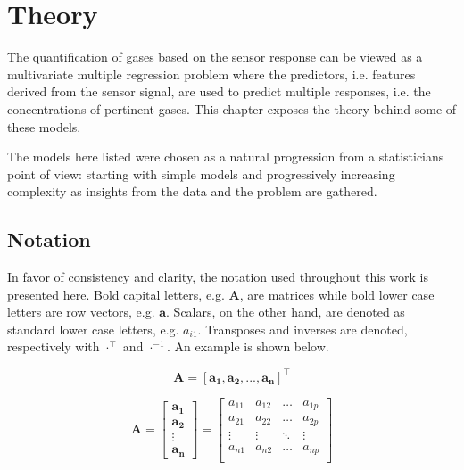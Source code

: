 \chapter{Theory}
\label{cha:theory}

The quantification of gases based on the sensor response can be viewed as a multivariate multiple regression problem where the predictors, i.e. features derived from the sensor signal, are used to predict multiple responses, i.e. the concentrations of pertinent gases. This chapter exposes the theory behind some of these models.

The models here listed were chosen as a natural progression from a statisticians point of view: starting with simple models and progressively increasing complexity as insights from the data and the problem are gathered.
\section{Notation}
\label{sec:notation}

In favor of consistency and clarity, the notation used throughout this work is presented here. Bold capital letters, e.g. $\mathbf{A}$, are matrices while bold lower case letters are row vectors, e.g. $\mathbf{a}$. Scalars, on the other hand, are denoted as standard lower case letters, e.g. $a_{i1}$. Transposes and inverses are denoted, respectively with $\cdot^\intercal $ and $\cdot^{-1}$. An example is shown below.

\begin{equation*}
	\mathbf{A = [a_1, a_2, ..., a_n]^\intercal}
\end{equation*}

\begin{equation*}
	\mathbf{A} = 
	\begin{bmatrix}
		
		\mathbf{a_1}\\
		\mathbf{a_2}\\
		\vdots \\
		\mathbf{a_n}
	\end{bmatrix}
	=
	\begin{bmatrix}
		
		a_{11} & a_{12} & \dots & a_{1p}\\
		a_{21} & a_{22} & \dots & a_{2p}\\
		\vdots  & \vdots & \ddots &\vdots\\
		a_{n1} & a_{n2} & \dots & a_{np}\\
	\end{bmatrix}
\end{equation*}


